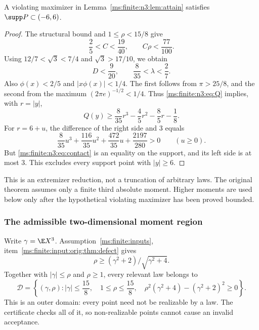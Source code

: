 \begin{lemma}\label{ms:finite:n3:lem:support}
A violating maximizer in Lemma~\ref{ms:finite:n3:lem:attain} satisfies
$\supp P\subset(-6,6)$.
\end{lemma}
\begin{proof}
The structural bound and $1\le\rho<15/8$ give
\[
 \frac25<C<\frac{19}{40},\qquad C\rho<\frac{77}{100}.
\]
Using $12/7<\sqrt3<7/4$ and $\sqrt3>17/10$, we obtain
\[
 D<\frac9{20},\qquad \frac8{35}<\lambda<\frac27.
\]
Also $\phi(x)<2/5$ and $|x\phi(x)|<1/4$. The first follows from
$\pi>25/8$, and the second from the maximum
$(2\pi e)^{-1/2}<1/4$. Thus \eqref{ms:finite:n3:eq:Q} implies, with $r=|y|$,
\[
 Q(y)\ge\frac8{35}r^3-\frac45r^2-\frac85r-\frac18.
\]
For $r=6+u$, the difference of the right side and $3$ equals
\[
 \frac8{35}u^3+\frac{116}{35}u^2+\frac{472}{35}u+
 \frac{2197}{280}>0\qquad(u\ge0).
\]
But \eqref{ms:finite:n3:eq:contact} is an equality on the support, and its left side is
at most $3$. This excludes every support point with $|y|\ge6$.
\end{proof}
\begin{remark}
This is an extremizer reduction, not a truncation of arbitrary laws.
The original theorem assumes only a finite third absolute moment.
Higher moments are used below only after the hypothetical violating
maximizer has been proved bounded.
\end{remark}

\subsubsection{The admissible two-dimensional moment region}
Write $\gamma=\E X^3$. Assumption~\ref{ms:finite:inputs}, item~\ref{ms:finite:input:orig:thm:defect} gives
\[
 \rho\ge(\gamma^2+2)/\sqrt{\gamma^2+4}.
\]
Together with $|\gamma|\le\rho$ and $\rho\ge1$, every relevant law belongs to
\begin{equation}\label{ms:finite:n3:eq:momdomain}
 \mathcal D=\left\{(\gamma,\rho):
 |\gamma|\le\frac{15}{8},\quad1\le\rho\le\frac{15}{8},\quad
 \rho^2(\gamma^2+4)-(\gamma^2+2)^2\ge0\right\}.
\end{equation}
This is an outer domain: every point need not be realizable by a law.
The certificate checks all of it, so non-realizable points cannot cause
an invalid acceptance.

